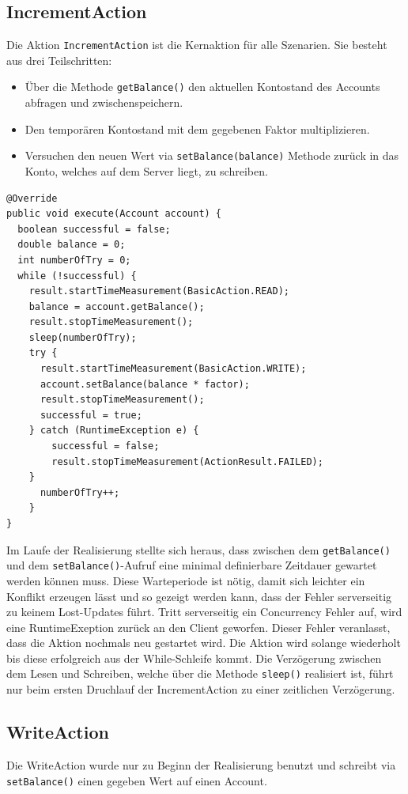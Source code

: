  
\subsection{IncrementAction}
\label{sec:incrementAction}
Die Aktion \verb+IncrementAction+ ist die Kernaktion für alle Szenarien. Sie besteht aus drei Teilschritten:
\begin{itemize}
\item Über die Methode \verb+getBalance()+ den aktuellen Kontostand des Accounts abfragen und zwischenspeichern.
\item Den temporären Kontostand mit dem gegebenen Faktor multiplizieren.
\item Versuchen den neuen Wert via \verb+setBalance(balance)+ Methode zurück in das Konto, welches auf dem Server liegt, zu schreiben. 
\end{itemize}

\begin{verbatim}
@Override
public void execute(Account account) {
  boolean successful = false;
  double balance = 0;
  int numberOfTry = 0;
  while (!successful) {
    result.startTimeMeasurement(BasicAction.READ);
    balance = account.getBalance();
    result.stopTimeMeasurement();
    sleep(numberOfTry);
    try {
	  result.startTimeMeasurement(BasicAction.WRITE);
	  account.setBalance(balance * factor);
	  result.stopTimeMeasurement();
	  successful = true;
	} catch (RuntimeException e) {
  	    successful = false;
	    result.stopTimeMeasurement(ActionResult.FAILED);
	}
	  numberOfTry++;
	}
}
\end{verbatim}
Im Laufe der Rea\-li\-sie\-rung stellte sich her\-aus, dass zwi\-schen dem \verb+getBalance()+ und dem \verb+setBalance()+-Auf\-ruf eine mi\-ni\-mal de\-fi\-nier\-ba\-re Zeit\-dauer ge\-wartet werden können muss. Diese Warteperiode ist nötig, damit sich leichter ein Konflikt erzeugen lässt und so gezeigt werden kann, dass der Fehler serverseitig zu keinem Lost-Updates führt. Tritt serverseitig ein Concurrency Fehler auf, wird eine RuntimeExeption zurück an den Client geworfen. Dieser Fehler veranlasst, dass die Aktion nochmals neu gestartet wird. Die Aktion wird solange wiederholt bis diese erfolgreich aus der While-Schleife kommt. Die Verzögerung zwischen dem Lesen und Schreiben, welche über die Methode \verb+sleep()+ realisiert ist, führt nur beim ersten Druchlauf der IncrementAction zu einer zeitlichen Verzögerung.

\subsection{WriteAction}
\label{sec:writeAction}
Die WriteAction wurde nur zu Beginn der Realisierung benutzt und schreibt via \verb+setBalance()+ einen gegeben Wert auf einen Account.

